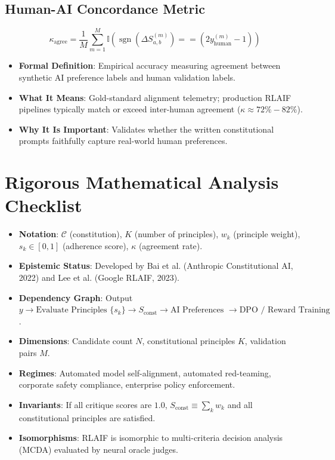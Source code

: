 \documentclass[11pt,a4paper]{article}
\theoremstyle{definition}
\begin{document}
\subsection{Human-AI Concordance Metric}
{\boldmath
\begin{equation}
\kappa_{\text{agree}} = \frac{1}{M}\sum_{m=1}^M \mathbb{I}\left( \operatorname{sgn}(\Delta S_{a, b}^{(m)}) == (2 y_{\text{human}}^{(m)} - 1) \right)
\end{equation}
}
\begin{itemize}
    \item \textbf{Formal Definition}: Empirical accuracy measuring agreement between synthetic AI preference labels and human validation labels.
    \item \textbf{What It Means}: Gold-standard alignment telemetry; production RLAIF pipelines typically match or exceed inter-human agreement ($\kappa \approx 72\% - 82\%$).
    \item \textbf{Why It Is Important}: Validates whether the written constitutional prompts faithfully capture real-world human preferences.
\end{itemize}

\section{Rigorous Mathematical Analysis Checklist}

\begin{itemize}
    \item \textbf{Notation}: $\mathcal{C}$ (constitution), $K$ (number of principles), $w_k$ (principle weight), $s_k \in [0, 1]$ (adherence score), $\kappa$ (agreement rate).
    \item \textbf{Epistemic Status}: Developed by Bai et al. (Anthropic Constitutional AI, 2022) and Lee et al. (Google RLAIF, 2023).
    \item \textbf{Dependency Graph}: Output $y \to \text{Evaluate Principles } \{s_k\} \to S_{\text{const}} \to \text{AI Preferences } \to \text{DPO / Reward Training}$.
    \item \textbf{Dimensions}: Candidate count $N$, constitutional principles $K$, validation pairs $M$.
    \item \textbf{Regimes}: Automated model self-alignment, automated red-teaming, corporate safety compliance, enterprise policy enforcement.
    \item \textbf{Invariants}: If all critique scores are $1.0$, $S_{\text{const}} \equiv \sum_k w_k$ and all constitutional principles are satisfied.
    \item \textbf{Isomorphisms}: RLAIF is isomorphic to multi-criteria decision analysis (MCDA) evaluated by neural oracle judges.
\end{itemize}
\end{document}
